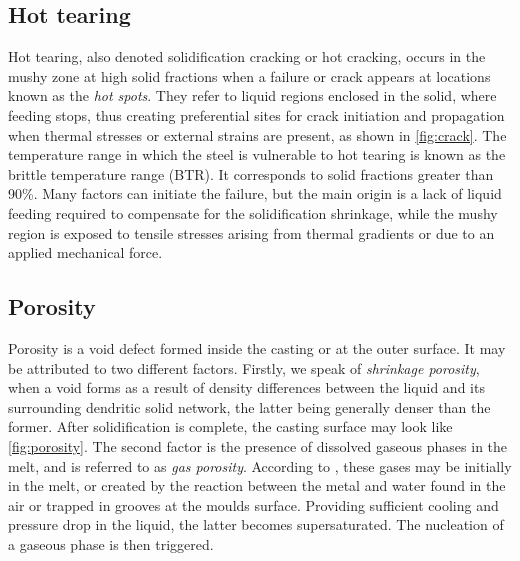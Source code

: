 %
%
\subsection*{Hot tearing} 
%
Hot tearing, also denoted solidification cracking or hot cracking, occurs in the mushy zone 
at high solid fractions when a failure or crack appears at locations known as the \emph{hot spots}. 
They refer to liquid regions enclosed in the solid, where feeding stops, 
thus creating preferential sites for crack initiation and propagation when thermal stresses or external 
strains are present, as shown in \cref{fig:crack}. 
The temperature range in which the steel is vulnerable to hot tearing is known as the brittle 
temperature range (BTR). It corresponds to solid fractions greater than \num{90}\%.
Many factors can initiate the failure, but the main origin is a 
lack of liquid feeding required to compensate for the solidification shrinkage, while the mushy region
is exposed to tensile stresses arising from thermal gradients or due to an applied mechanical force.
\subsection*{Porosity}
%
Porosity is a void defect formed inside the casting or at the outer surface. It may be attributed to two different factors.
Firstly, we speak of \emph{shrinkage porosity}, when a void forms as a result of density 
differences between the liquid and its surrounding dendritic solid network, the latter being generally denser 
than the former. After solidification is complete, the casting surface may look like \cref{fig:porosity}.
The second factor is the presence of dissolved gaseous phases in the melt, and is referred to as \emph{gas porosity}. 
According to \citet{dantzig_solidification_2009}, these gases may be initially in the melt, or created by the 
reaction between the metal and water found in the air or trapped in grooves at the moulds surface. Providing sufficient cooling
and pressure drop in the liquid, the latter becomes supersaturated. 
The nucleation of a gaseous phase is then triggered.

